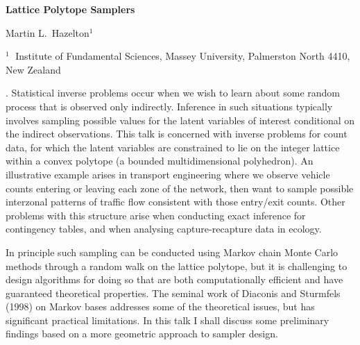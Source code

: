 \documentclass[12pt]{article}
\begin{document}
\begin{flushleft}


{\LARGE\bf Lattice Polytope Samplers}


\vspace{1.0cm}

Martin L.~Hazelton$^1$

\begin{description}

\item $^1 \;$ Institute of Fundamental Sciences, Massey University, Palmerston North 4410, New Zealand



\end{description}

\end{flushleft}


\vspace{0.75cm}

. 
Statistical inverse problems occur when we wish to learn about some random process that is
observed only indirectly. Inference in such situations typically involves sampling possible values
for the latent variables of interest conditional on the indirect observations. This talk is concerned
with inverse problems for count data, for which the latent variables are constrained to lie on the
integer lattice within a convex polytope (a bounded multidimensional polyhedron). An illustrative
example arises in transport engineering where we observe vehicle counts entering or leaving each
zone of the network, then want to sample possible interzonal patterns of traffic flow consistent with
those entry/exit counts. Other problems with this structure arise when conducting exact inference
for contingency tables, and when analysing capture-recapture data in ecology.

In principle such sampling can be conducted using Markov chain Monte Carlo methods through a
random walk on the lattice polytope, but it is challenging to design algorithms for doing so that are
both computationally efficient and have guaranteed theoretical properties. The seminal work of 
Diaconis and Sturmfels (1998) on Markov bases addresses some of the theoretical issues, but has 
significant practical limitations. In this talk I shall discuss some preliminary findings based on 
a more geometric approach to sampler design.
\end{document}
